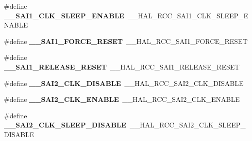 \begin{DoxyCompactItemize}
\item 
\mbox{\label{group___h_a_l___r_c_c___aliased_ga930f613f28d57aaec974d8a0e611c373}} 
\#define {\bfseries \+\_\+\+\_\+\+S\+A\+I1\+\_\+\+C\+L\+K\+\_\+\+S\+L\+E\+E\+P\+\_\+\+E\+N\+A\+B\+LE}~\+\_\+\+\_\+\+H\+A\+L\+\_\+\+R\+C\+C\+\_\+\+S\+A\+I1\+\_\+\+C\+L\+K\+\_\+\+S\+L\+E\+E\+P\+\_\+\+E\+N\+A\+B\+LE
\item 
\mbox{\label{group___h_a_l___r_c_c___aliased_ga6fa8759253db7e8a4feaf7e4f5e40a3e}} 
\#define {\bfseries \+\_\+\+\_\+\+S\+A\+I1\+\_\+\+F\+O\+R\+C\+E\+\_\+\+R\+E\+S\+ET}~\+\_\+\+\_\+\+H\+A\+L\+\_\+\+R\+C\+C\+\_\+\+S\+A\+I1\+\_\+\+F\+O\+R\+C\+E\+\_\+\+R\+E\+S\+ET
\item 
\mbox{\label{group___h_a_l___r_c_c___aliased_ga9348bdfef0e79a335e4c4c00cdd77e18}} 
\#define {\bfseries \+\_\+\+\_\+\+S\+A\+I1\+\_\+\+R\+E\+L\+E\+A\+S\+E\+\_\+\+R\+E\+S\+ET}~\+\_\+\+\_\+\+H\+A\+L\+\_\+\+R\+C\+C\+\_\+\+S\+A\+I1\+\_\+\+R\+E\+L\+E\+A\+S\+E\+\_\+\+R\+E\+S\+ET
\item 
\mbox{\label{group___h_a_l___r_c_c___aliased_gadec8489576c1a83913f620c66517bff6}} 
\#define {\bfseries \+\_\+\+\_\+\+S\+A\+I2\+\_\+\+C\+L\+K\+\_\+\+D\+I\+S\+A\+B\+LE}~\+\_\+\+\_\+\+H\+A\+L\+\_\+\+R\+C\+C\+\_\+\+S\+A\+I2\+\_\+\+C\+L\+K\+\_\+\+D\+I\+S\+A\+B\+LE
\item 
\mbox{\label{group___h_a_l___r_c_c___aliased_ga918b0825bcbcaadad3cf40c7127c8322}} 
\#define {\bfseries \+\_\+\+\_\+\+S\+A\+I2\+\_\+\+C\+L\+K\+\_\+\+E\+N\+A\+B\+LE}~\+\_\+\+\_\+\+H\+A\+L\+\_\+\+R\+C\+C\+\_\+\+S\+A\+I2\+\_\+\+C\+L\+K\+\_\+\+E\+N\+A\+B\+LE
\item 
\mbox{\label{group___h_a_l___r_c_c___aliased_ga3a28b6eb8d71db32559ae19c0c451588}} 
\#define {\bfseries \+\_\+\+\_\+\+S\+A\+I2\+\_\+\+C\+L\+K\+\_\+\+S\+L\+E\+E\+P\+\_\+\+D\+I\+S\+A\+B\+LE}~\+\_\+\+\_\+\+H\+A\+L\+\_\+\+R\+C\+C\+\_\+\+S\+A\+I2\+\_\+\+C\+L\+K\+\_\+\+S\+L\+E\+E\+P\+\_\+\+D\+I\+S\+A\+B\+LE
\item 
\mbox{\label{group___h_a_l___r_c_c___aliased_gad98dccd681d974c77f35066e0bc25026}} 

\end{DoxyCompactItemize}
